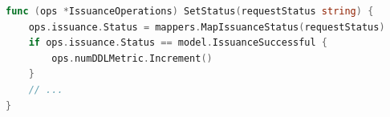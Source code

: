 \begin{lstlisting}[caption = {Usage of the SPMonitor Library in AM-DrivingLicenseManagement}, label = {lis:am_dlm_num_ddl}, style = kit-cm, language=Go]
func (ops *IssuanceOperations) SetStatus(requestStatus string) {
	ops.issuance.Status = mappers.MapIssuanceStatus(requestStatus)
	if ops.issuance.Status == model.IssuanceSuccessful {
		ops.numDDLMetric.Increment()
	}
	// ...
}
\end{lstlisting}